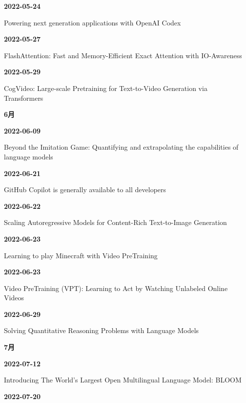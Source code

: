 \smallskip
\noindent\textbf{2022-05-24}\par
{\raggedright Powering next generation applications with OpenAI Codex\,\cite{src-21b0842f98ec}\par}
\smallskip
\noindent\textbf{2022-05-27}\par
{\raggedright FlashAttention: Fast and Memory-Efficient Exact Attention with IO-Awareness\,\cite{src-be136777aa4f}\par}
\smallskip
\noindent\textbf{2022-05-29}\par
{\raggedright CogVideo: Large-scale Pretraining for Text-to-Video Generation via Transformers\,\cite{chron-2b03ce8cc258}\par}
\smallskip
\medskip
\noindent\textbf{6月}\par
\smallskip
\noindent\textbf{2022-06-09}\par
{\raggedright Beyond the Imitation Game: Quantifying and extrapolating the capabilities of language models\,\cite{src-f02969e400b0}\par}
\smallskip
\noindent\textbf{2022-06-21}\par
{\raggedright GitHub Copilot is generally available to all developers\,\cite{src-b1418e7ae779}\par}
\smallskip
\noindent\textbf{2022-06-22}\par
{\raggedright Scaling Autoregressive Models for Content-Rich Text-to-Image Generation\,\cite{chron-76a3e028865e}\par}
\smallskip
\noindent\textbf{2022-06-23}\par
{\raggedright Learning to play Minecraft with Video PreTraining\,\cite{src-4e33c3e8216e}\par}
\smallskip
\noindent\textbf{2022-06-23}\par
{\raggedright Video PreTraining (VPT): Learning to Act by Watching Unlabeled Online Videos\,\cite{src-d117f3860a91}\par}
\smallskip
\noindent\textbf{2022-06-29}\par
{\raggedright Solving Quantitative Reasoning Problems with Language Models\,\cite{chron-5e7ced02a95b}\par}
\smallskip
\medskip
\noindent\textbf{7月}\par
\smallskip
\noindent\textbf{2022-07-12}\par
{\raggedright Introducing The World's Largest Open Multilingual Language Model: BLOOM\,\cite{src-4dd33abe1509}\par}
\smallskip
\noindent\textbf{2022-07-20}\par
